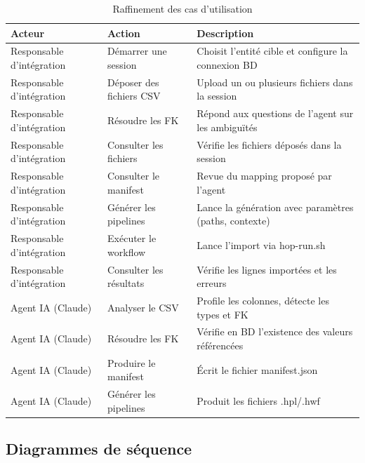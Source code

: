 \begin{table}[H]
  \centering
  \renewcommand{\arraystretch}{1.4}
  \begin{tabular}{p{3.5cm} p{4cm} p{6cm}}
    \toprule
    \rowcolor{gray!20}
    \textbf{Acteur} & \textbf{Action} & \textbf{Description} \\
    \midrule
    \rowcolor{gray!5}
    Responsable d'intégration & Démarrer une session & Choisit l'entité cible et configure la connexion BD \\
    Responsable d'intégration & Déposer des fichiers CSV & Upload un ou plusieurs fichiers dans la session \\
    \rowcolor{gray!5}
    Responsable d'intégration & Résoudre les FK & Répond aux questions de l'agent sur les ambiguïtés \\
    Responsable d'intégration & Consulter les fichiers & Vérifie les fichiers déposés dans la session \\
    \rowcolor{gray!5}
    Responsable d'intégration & Consulter le manifest & Revue du mapping proposé par l'agent \\
    Responsable d'intégration & Générer les pipelines & Lance la génération avec paramètres (paths, contexte) \\
    \rowcolor{gray!5}
    Responsable d'intégration & Exécuter le workflow & Lance l'import via hop-run.sh \\
    Responsable d'intégration & Consulter les résultats & Vérifie les lignes importées et les erreurs \\
    \midrule
    \rowcolor{gray!5}
    Agent IA (Claude) & Analyser le CSV & Profile les colonnes, détecte les types et FK \\
    Agent IA (Claude) & Résoudre les FK & Vérifie en BD l'existence des valeurs référencées \\
    \rowcolor{gray!5}
    Agent IA (Claude) & Produire le manifest & Écrit le fichier manifest.json \\
    Agent IA (Claude) & Générer les pipelines & Produit les fichiers .hpl/.hwf \\
    \bottomrule
  \end{tabular}
  \caption{Raffinement des cas d'utilisation}
  \label{tab:raffinement}
\end{table}

\subsection{Diagrammes de séquence}

